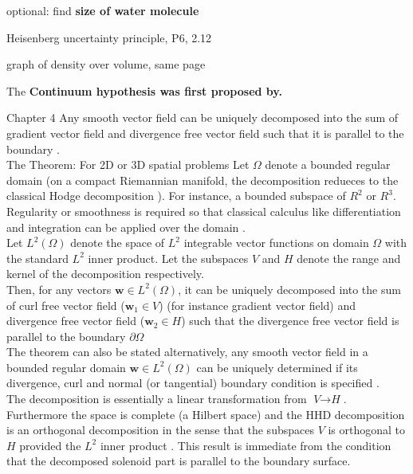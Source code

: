 optional: find \textbf{size of water molecule}

Heisenberg uncertainty principle, P6, 2.12

graph of density over volume, same page

The \textbf{Continuum hypothesis was first proposed by.} 

Chapter 4
Any smooth vector field can be uniquely decomposed into the sum of gradient vector field and divergence free vector field such that it is parallel to the boundary \cite{chorin1990mathematical,maria2003application}.\\

The Theorem: For 2D or 3D spatial problems
Let $\Omega$ denote a bounded regular domain (on a compact Riemannian manifold, the decomposition redueces to the classical Hodge decomposition \cite{maria2003application}). For instance, a bounded subspace of $\textbf{$R^2$}$ or $\textbf{$R^3$}$. Regularity or smoothness is required so that classical calculus like differentiation and integration can be applied over the domain \cite{maria2003application,chorin1990mathematical}.\\ 
Let $\textit{$L^2$} (\Omega)$ denote the space of $\textit{$L^2$}$ integrable vector functions on domain $\Omega$ with the standard $\textit{$L^2$}$ inner product. Let the subspaces $\textit{V}$ and $\textit{H}$ denote the range and kernel of the decomposition respectively.\\
Then, for any vectors $\textbf{w} \in \textit{$L^2$} (\Omega)$, it can be uniquely decomposed \cite{chorin1990mathematical,maria2003application,brown2001accurate} into the sum of curl free vector field ($\textbf{w}_1 \in \textit{V}$) (for instance gradient vector field) and divergence free vector field ($\textbf{w}_2 \in \textit{H}$) such that the divergence free vector field is parallel to the boundary $\partial \Omega$\\
The theorem can also be stated alternatively, any smooth vector field in a bounded regular domain $\textbf{w} \in \textit{$L^2$} (\Omega)$ can be uniquely determined if its divergence, curl and normal (or tangential) boundary condition is specified \cite{maria2003application}.\\

The decomposition is essentially a linear transformation from $\textit{V} \to \textit{H}$.\\
Furthermore the space is complete (a Hilbert space) and the HHD decomposition is an orthogonal decomposition in the sense that the subspaces $\textit{V}$ is orthogonal to $\textit{H}$ provided the $\textit{L}^2$ inner product \cite{maria2003application}. This result is immediate from the condition that the decomposed solenoid part is parallel to the boundary surface.\\

